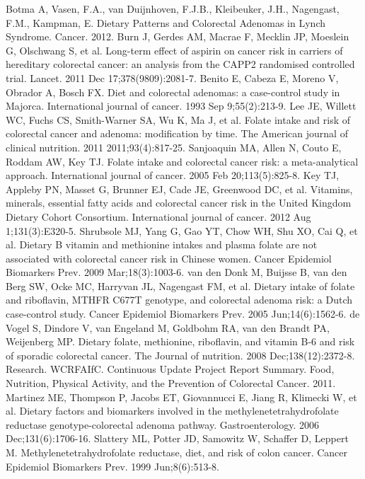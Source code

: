 \begin{thebibliography}{12}
		Botma A, Vasen, F.A., van Duijnhoven, F.J.B., Kleibeuker, J.H., Nagengast, F.M., Kampman, E. Dietary Patterns and Colorectal Adenomas in Lynch Syndrome. Cancer. 2012. 
		Burn J, Gerdes AM, Macrae F, Mecklin JP, Moeslein G, Olschwang S, et al. Long-term effect of aspirin on cancer risk in carriers of hereditary colorectal cancer: an analysis from the CAPP2 randomised controlled trial. Lancet. 2011 Dec 17;378(9809):2081-7. 
		Benito E, Cabeza E, Moreno V, Obrador A, Bosch FX. Diet and colorectal adenomas: a case-control study in Majorca. International journal of cancer. 1993 Sep 9;55(2):213-9. 
		Lee JE, Willett WC, Fuchs CS, Smith-Warner SA, Wu K, Ma J, et al. Folate intake and risk of colorectal cancer and adenoma: modification by time. The American journal of clinical nutrition. 2011 2011;93(4):817-25. 
		Sanjoaquin MA, Allen N, Couto E, Roddam AW, Key TJ. Folate intake and colorectal cancer risk: a meta-analytical approach. International journal of cancer. 2005 Feb 20;113(5):825-8. 
		Key TJ, Appleby PN, Masset G, Brunner EJ, Cade JE, Greenwood DC, et al. Vitamins, minerals, essential fatty acids and colorectal cancer risk in the United Kingdom Dietary Cohort Consortium. International journal of cancer. 2012 Aug 1;131(3):E320-5. 
		Shrubsole MJ, Yang G, Gao YT, Chow WH, Shu XO, Cai Q, et al. Dietary B vitamin and methionine intakes and plasma folate are not associated with colorectal cancer risk in Chinese women. Cancer Epidemiol Biomarkers Prev. 2009 Mar;18(3):1003-6. 
		van den Donk M, Buijsse B, van den Berg SW, Ocke MC, Harryvan JL, Nagengast FM, et al. Dietary intake of folate and riboflavin, MTHFR C677T genotype, and colorectal adenoma risk: a Dutch case-control study. Cancer Epidemiol Biomarkers Prev. 2005 Jun;14(6):1562-6. 
		de Vogel S, Dindore V, van Engeland M, Goldbohm RA, van den Brandt PA, Weijenberg MP. Dietary folate, methionine, riboflavin, and vitamin B-6 and risk of sporadic colorectal cancer. The Journal of nutrition. 2008 Dec;138(12):2372-8. 
		Research. WCRFAIfC. Continuous Update Project Report Summary. Food, Nutrition, Physical Activity, and the Prevention of Colorectal Cancer. 2011. 
		Martinez ME, Thompson P, Jacobs ET, Giovannucci E, Jiang R, Klimecki W, et al. Dietary factors and biomarkers involved in the methylenetetrahydrofolate reductase genotype-colorectal adenoma pathway. Gastroenterology. 2006 Dec;131(6):1706-16. 
		Slattery ML, Potter JD, Samowitz W, Schaffer D, Leppert M. Methylenetetrahydrofolate reductase, diet, and risk of colon cancer. Cancer Epidemiol Biomarkers Prev. 1999 Jun;8(6):513-8. 

\end{thebibliography}
